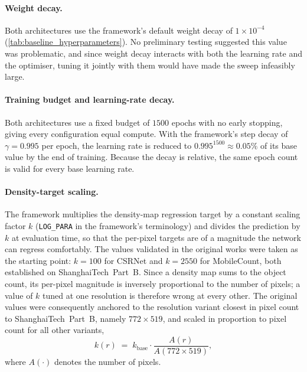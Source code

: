 \documentclass[conference]{IEEEtran}
\begin{document}
\paragraph{Weight decay.}
Both architectures use the \CCC{} framework's default weight decay of $1\times10^{-4}$ (\cref{tab:baseline_hyperparameters}). No preliminary
testing suggested this value was problematic, and since weight decay interacts with both the learning rate and the optimiser, tuning it jointly with them would have made the sweep infeasibly large.

\paragraph{Training budget and learning-rate decay.}
Both architectures use a fixed budget of $1500$ epochs with no early stopping, giving every configuration equal compute. With the framework's step decay of $\gamma=0.995$ per epoch, the learning rate is reduced to $0.995^{1500}\approx0.05\%$ of its base value by the end
of training. Because the decay is relative, the same epoch count is valid for every base learning rate.

\paragraph{Density-target scaling.}
The framework multiplies the density-map regression target by a
constant scaling factor $k$ (\texttt{LOG\_PARA} in the framework's
terminology) and divides the prediction by $k$ at evaluation time, so
that the per-pixel targets are of a magnitude the network can regress
comfortably. The values validated in the original works were taken as the starting point:
$k=100$ for CSRNet and $k=2550$ for MobileCount, both established on
ShanghaiTech~Part~B. Since a density map sums to the object count, its
per-pixel magnitude is inversely proportional to the number of pixels;
a value of $k$ tuned at one resolution is therefore wrong at every
other. The original values were consequently anchored to the resolution
variant closest in pixel count to ShanghaiTech~Part~B, namely
$772\times519$, and scaled in proportion to pixel count for all other
variants,
\begin{equation}
    k(r) \;=\; k_{\mathrm{base}}\cdot
    \frac{A(r)}{A(772\times519)},
    \label{eq:logpara_scaling}
\end{equation}
where $A(\cdot)$ denotes the number of pixels. 
\end{document}
